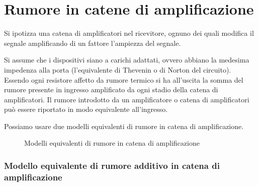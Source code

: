 \section{Rumore in catene di amplificazione}
Si ipotizza una catena di amplificatori nel ricevitore, ognuno dei quali modifica il segnale amplificando di un fattore l'ampiezza del segnale.

Si assume che i dispositivi siano a carichi adattati, ovvero abbiano la medesima impedenza alla porta (l'equivalente di Thevenin o di Norton del circuito). Essendo ogni resistore affetto da rumore termico si ha all'uscita la somma del rumore presente in ingresso amplificato da ogni stadio della catena di amplificatori. Il rumore introdotto da un amplificatore o catena di amplificatori può essere riportato in modo equivalente all'ingresso.

Possiamo usare due modelli equivalenti di rumore in catena di amplificazione.

\begin{figure}[t]
	\centering
	\quad{}
	\caption{Modelli equivalenti di rumore in catena di amplificazione}
\end{figure}

\subsubsection{Modello equivalente di rumore additivo in catena di amplificazione}

